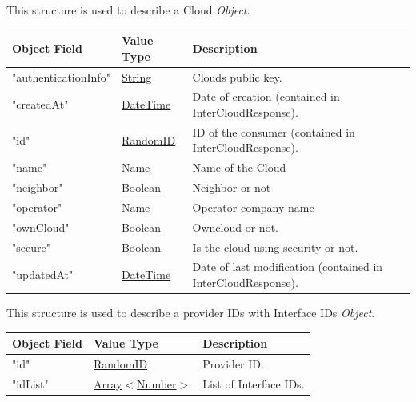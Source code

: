 \documentclass[a4paper]{arrowhead}
\newcommand{\mref}[1]{{\textcolor{ArrowheadPurple}{\hyperref[sec:model:#1]{#1}}}}
\newcommand{\pref}[1]{{\textcolor{ArrowheadGrey}{\hyperref[sec:model:primitives:#1]{#1}}}}
\begin{document}

This structure is used to describe a Cloud \textit{Object}.

\begin{table}[ht!]
\begin{tabularx}{\textwidth}{| p{5cm} | p{3.5cm} | X |} \hline
\rowcolor{gray!33} Object Field & Value Type      & Description \\ \hline
"authenticationInfo"  & \pref{String}     & Clouds public key. \\ \hline
"createdAt"           & \pref{DateTime}   & Date of creation (contained in InterCloudResponse). \\ \hline
"id"                  & \pref{RandomID}     & ID of the consumer (contained in InterCloudResponse). \\ \hline
"name"                & \pref{Name}       & Name of the Cloud \\ \hline
"neighbor"            & \pref{Boolean}    & Neighbor or not \\ \hline
"operator"            & \pref{Name}       & Operator company name \\ \hline
"ownCloud"            & \pref{Boolean}    & Owncloud or not. \\ \hline
"secure"              & \pref{Boolean}    & Is the cloud using security or not. \\ \hline
"updatedAt"           & \pref{DateTime}   & Date of last modification (contained in InterCloudResponse). \\ \hline

\end{tabularx}
\end{table}


This structure is used to describe a provider IDs with Interface IDs \textit{Object}.

\begin{table}[ht!]
\begin{tabularx}{\textwidth}{| p{5cm} | p{3.5cm} | X |} \hline
\rowcolor{gray!33} Object Field & Value Type      & Description \\ \hline
"id"                   & \pref{RandomID}     & Provider ID. \\ \hline
"idList"  & \pref{Array}$<$\mref{Number}$>$     & List of Interface IDs. \\ \hline

\end{tabularx}
\end{table}
\end{document}
